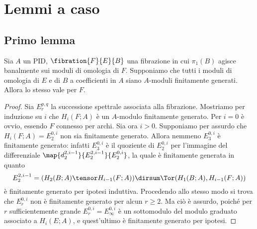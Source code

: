 \chapter{Lemmi a caso}


\section{Primo lemma}
\begin{proposition}
Sia $A$ un PID, $\fibration{F}{E}{B}$ una fibrazione in cui $\pi_1(B)$ agisce banalmente sui moduli di omologia di $F$. Supponiamo che tutti i moduli di omologia di $E$ e di $B$ a coefficienti in $A$ siano $A$-moduli finitamente generati. Allora lo stesso vale per $F$.
\end{proposition}
\begin{proof}
Sia $E^{p,q}_r$ la successione spettrale associata alla fibrazione. Mostriamo per induzione su $i$ che $H_i(F;A)$ è un $A$-modulo finitamente generato. Per $i=0$ è ovvio, essendo $F$ connesso per archi. Sia ora $i>0$. Supponiamo per assurdo che $H_i(F;A)=E^{0,i}_2$ non sia finitamente generato. Allora nemmeno $E^{0,i}_3$ è finitamente generato: infatti $E^{0,i}_3$ è il quoziente di $E^{0,i}_2$ per l'immagine del differenziale $\map{d^{2,i-1}_2}{E^{2,i-1}_2}{E^{0,i}_2}$, la quale è finitamente generata in quanto
$$
E^{2,i-1}_2=(H_2(B;A)\tensor H_{i-1}(F;A))\dirsum\Tor(H_1(B;A),H_{i-1}(F;A))
$$
è finitamente generato per ipotesi induttiva. Procedendo allo stesso modo si trova che $E^{0,i}_r$ non è finitamente generato per alcun $r\ge 2$. Ma ciò è assurdo, poiché per $r$ sufficientemente grande $E^{0,i}_r=E^{0,i}_\infty$ è un sottomodulo del modulo graduato associato a $H_i(E;A)$, e quest'ultimo è finitamente generato per ipotesi.
\end{proof}

